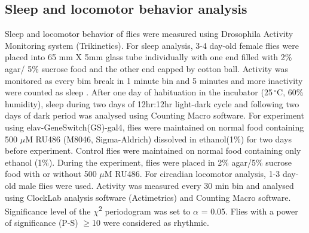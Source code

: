 \subsection*{Sleep and locomotor behavior analysis}

Sleep and locomotor behavior of flies were measured using Drosophila Activity Monitoring system (Trikinetics).
For sleep analysis, 3-4 day-old female flies were placed into 65 mm X 5mm glass tube individually with one end filled with 2\% agar/ 5\% sucrose food and the other end capped by cotton ball.
Activity was monitored as every bim break in 1 minute bin and 5 minutes and more inactivity were counted as sleep \cite{Shaw:2000ui}.
After one day of habituation in the incubator (25$\,^{\circ}\mathrm{C}$, 60\% humidity), sleep during two days of 12hr:12hr light-dark cycle and following two days of dark period was analysed using Counting Macro software\cite{pfeiffenberger:2010ab}.
For experiment using elav-GeneSwitch(GS)-gal4, flies were maintained on normal food containing 500 $\mu$M RU486 (M8046, Sigma-Aldrich) dissolved in ethanol(1\%) for two days before experiment.
Control flies were maintained on normal food containing only ethanol (1\%).
During the experiment, flies were placed in 2\% agar/5\% sucrose food with or without 500 $\mu$M RU486. 
For circadian locomotor analysis, 1-3 day-old male flies were used. Activity was measured every 30 min bin and analysed using ClockLab analysis software (Actimetrics) and Counting Macro software\cite{Pfeiffenberger_2010}. Significance level of the $\chi$\textsuperscript{2} periodogram was set to $\alpha$ = 0.05.
Flies with a power of significance (P-S) $\geq$10 were considered as rhythmic.
  
  
  
  
  
  
  
  
  
  
  
  
  
  
  